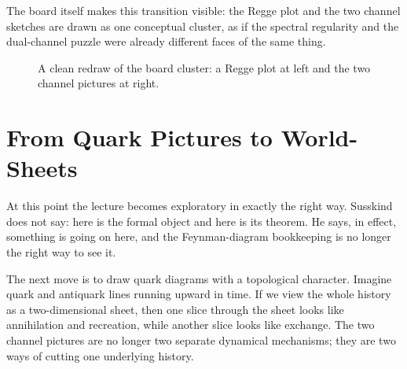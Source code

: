 The board itself makes this transition visible: the Regge plot and the two channel sketches are drawn as one conceptual cluster, as if the spectral regularity and the dual-channel puzzle were already different faces of the same thing.

\begin{figure}[t]
\centering
{}
\caption{A clean redraw of the board cluster: a Regge plot at left and the two channel pictures at right.}
\end{figure}

\section{From Quark Pictures to World-Sheets}

At this point the lecture becomes exploratory in exactly the right way. Susskind does not say: here is the formal object and here is its theorem. He says, in effect, something is going on here, and the Feynman-diagram bookkeeping is no longer the right way to see it.

The next move is to draw quark diagrams with a topological character. Imagine quark and antiquark lines running upward in time. If we view the whole history as a two-dimensional sheet, then one slice through the sheet looks like annihilation and recreation, while another slice looks like exchange. The two channel pictures are no longer two separate dynamical mechanisms; they are two ways of cutting one underlying history.

